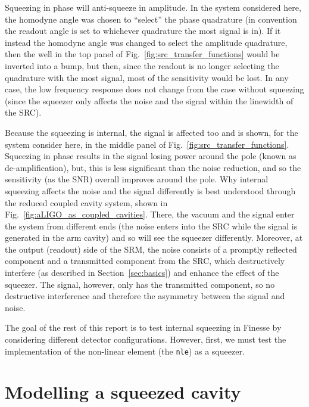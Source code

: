 \documentclass[aps,pra,superscriptaddress,reprint,nofootinbib]{revtex4-1}
\newcommand{\code}[1]{\texttt{#1}}
\begin{document}
Squeezing in phase will anti-squeeze in amplitude. In the system considered here, the homodyne angle was chosen to ``select'' the phase quadrature (in convention the readout angle is set to whichever quadrature the most signal is in). If it instead the homodyne angle was changed to select the amplitude quadrature, then the well in the top panel of Fig.~\ref{fig:src_transfer_functions} would be inverted into a bump, but then, since the readout is no longer selecting the quadrature with the most signal, most of the sensitivity would be lost. In any case, the low frequency response does not change from the case without squeezing (since the squeezer only affects the noise and the signal within the linewidth of the SRC).


Because the squeezing is internal, the signal is affected too and is shown, for the system consider here, in the middle panel of Fig.~\ref{fig:src_transfer_functions}. Squeezing in phase results in the signal losing power around the pole (known as de-amplification), but, this is less significant than the noise reduction, and so the sensitivity (as the SNR) overall improves around the pole.
Why internal squeezing affects the noise and the signal differently is best understood through the reduced coupled cavity system, shown in Fig.~\ref{fig:aLIGO_as_coupled_cavities}. There, the vacuum and the signal enter the system from different ends (the noise enters into the SRC while the signal is generated in the arm cavity) and so will see the squeezer differently. Moreover, at the output (readout) side of the SRM, the noise consists of a promptly reflected component and a transmitted component from the SRC, which destructively interfere (as described in Section~\ref{sec:basics}) and enhance the effect of the squeezer. The signal, however, only has the transmitted component, so no destructive interference and therefore the asymmetry between the signal and noise.


The goal of the rest of this report is to test internal squeezing in Finesse by considering different detector configurations. However, first, we must test the implementation of the non-linear element (the \code{nle}) as a squeezer.


\section{Modelling a squeezed cavity} %
\label{sec:sqzcavity}
\end{document}
